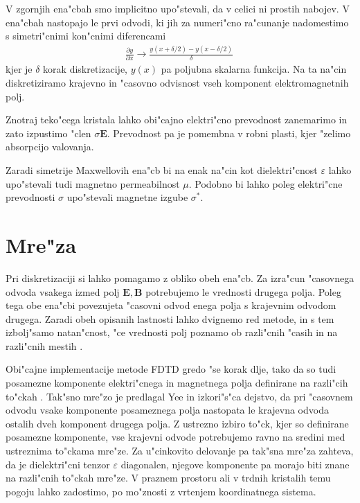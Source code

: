 \documentclass[12pt,twoside,openright,final]{report}
\renewcommand{\vec}{\mathbf}
\newcommand{\eps}{\varepsilon}
\begin{document}
V zgornjih ena"cbah smo implicitno upo"stevali, da v celici ni prostih nabojev.
V ena"cbah nastopajo le prvi odvodi, ki jih za numeri"cno ra"cunanje nadomestimo s simetri"cnimi kon"cnimi diferencami
\begin{align}
 \frac{\partial y}{\partial x} \rightarrow \frac{y(x+\delta/2) - y(x-\delta/2)}{\delta}\,
\end{align}
kjer je $\delta$ korak diskretizacije, $y(x)$ pa poljubna skalarna funkcija. 
Na ta na"cin diskretiziramo krajevno in "casovno odvisnost vseh komponent elektromagnetnih polj. 

Znotraj teko"cega kristala lahko obi"cajno elektri"cno prevodnost zanemarimo in zato izpustimo "clen $\sigma \vec E$. 
Prevodnost pa je pomembna v robni plasti, kjer "zelimo absorpcijo valovanja. 

Zaradi simetrije Maxwellovih ena"cb bi na enak na"cin kot dielektri"cnost $\varepsilon$ lahko upo"stevali tudi magnetno permeabilnost $\mu$. 
Podobno bi lahko poleg elektri"cne prevodnosti $\sigma$ upo"stevali magnetne izgube $\sigma^\ast$. 

\section{Mre"za}

Pri diskretizaciji si lahko pomagamo z obliko obeh ena"cb. 
Za izra"cun "casovnega odvoda vsakega izmed polj $\vec{E}, \vec{B}$ potrebujemo le vrednosti drugega polja. 
Poleg tega obe ena"cbi povezujeta "casovni odvod enega polja s krajevnim odvodom drugega. 
Zaradi obeh opisanih lastnosti lahko dvignemo red metode, in s tem izbolj"samo natan"cnost, "ce vrednosti polj poznamo ob razli"cnih "casih in na razli"cnih mestih \cite{taflove}. 

Obi"cajne implementacije metode \acs{FDTD} gredo "se korak dlje, tako da so tudi posamezne komponente elektri"cnega in magnetnega polja definirane na razli"cih to"ckah \cite{yee, yee-lattice}.
Tak"sno mre"zo je predlagal Yee in izkori"s"ca dejstvo, da pri "casovnem odvodu vsake komponente posameznega polja nastopata le krajevna odvoda ostalih dveh komponent drugega polja. 
Z ustrezno izbiro to"ck, kjer so definirane posamezne komponente, vse krajevni odvode potrebujemo ravno na sredini med ustreznima to"ckama mre"ze. 
Za u"cinkovito delovanje pa tak"sna mre"za zahteva, da je dielektri"cni tenzor $\eps$ diagonalen, njegove komponente pa morajo biti znane na razli"cnih to"ckah mre"ze. 
V praznem prostoru ali v trdnih kristalih temu pogoju lahko zadostimo, po mo"znosti z vrtenjem koordinatnega sistema.
\end{document}
